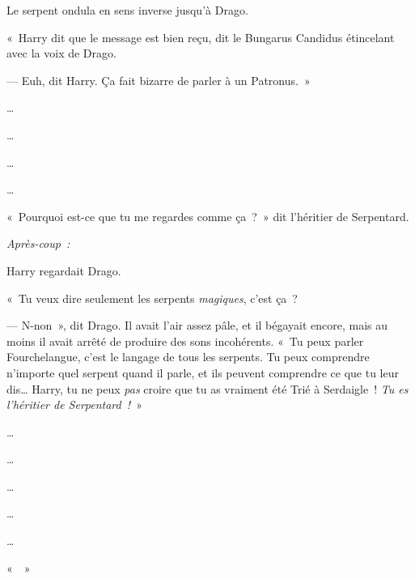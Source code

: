 Le serpent ondula en sens inverse jusqu'à Drago.

«~Harry dit que le message est bien reçu, dit le Bungarus Candidus étincelant avec la voix de Drago.

--- Euh, dit Harry. Ça fait bizarre de parler à un Patronus.~»

…

…

…

…

«~Pourquoi est-ce que tu me regardes comme ça~?~» dit l'héritier de Serpentard.

\later

\emph{Après-coup~:}

Harry regardait Drago.

«~Tu veux dire seulement les serpents \emph{magiques}, c'est ça~?

--- N-non~», dit Drago. Il avait l'air assez pâle, et il bégayait encore, mais au moins il avait arrêté de produire des sons incohérents. «~Tu peux parler Fourchelangue, c'est le langage de tous les serpents. Tu peux comprendre n'importe quel serpent quand il parle, et ils peuvent comprendre ce que tu leur dis… Harry, tu ne peux \emph{pas} croire que tu as vraiment été Trié à Serdaigle~! \emph{Tu es l'héritier de Serpentard~!}~»

…

…

…

…

…

«~~»

